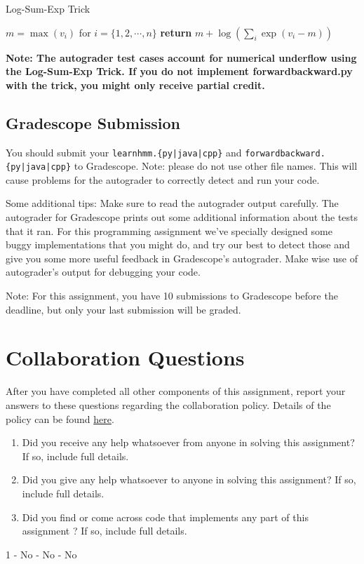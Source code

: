\documentclass[11pt,addpoints,answers]{exam}
\begin{document}
\begin{algorithm}[H]
    \caption{Log-Sum-Exp Trick}
    \label{alg:log-sum-exp-trick}
    \begin{algorithmic}[1]
            \State $m = \max(v_i)$ for $i=\{1, 2,\cdots, n\}$ 
            \State \textbf{return }{$m + \log(\sum_i\exp(v_i-m))$} 
        \EndProcedure
    \end{algorithmic}
\end{algorithm}

\textbf{Note: The autograder test cases account for numerical underflow using the Log-Sum-Exp Trick. If you do not implement \textbf{forwardbackward.py} with the trick, you might only receive partial credit.}

\vspace{0.2 in}    
\subsection{Gradescope Submission}

You should submit your \texttt{learnhmm.\{py|java|cpp\}} and %
\texttt{forwardbackward.\{py|java|cpp\}} to Gradescope.
Note: please do not use other file names. This will cause problems for the autograder to correctly detect and run your code.

Some additional tips: 
Make sure to read the autograder output carefully. The autograder for Gradescope prints out some additional 
information about the tests that it ran. For this programming assignment we've specially designed some buggy implementations that you might do, and try our best to detect those and give you some more useful feedback in Gradescope's autograder. Make wise use of autograder's output for debugging your code. 


Note: For this assignment, you have 10 submissions to Gradescope before the deadline, but only your last submission will be graded.


\newpage
\section{Collaboration Questions}
After you have completed all other components of this assignment, report your answers to these questions regarding the collaboration policy. Details of the policy can be found \href{http://www.cs.cmu.edu/~mgormley/courses/10601/syllabus.html}{here}.
\begin{enumerate}
    \item Did you receive any help whatsoever from anyone in solving this assignment? If so, include full details.
    \item Did you give any help whatsoever to anyone in solving this assignment? If so, include full details.
    \item Did you find or come across code that implements any part of this assignment ? If so, include full details.
\end{enumerate}

\begin{your_solution}[height=6cm]
1 - No  - No  - No

\end{your_solution}
\end{document}
